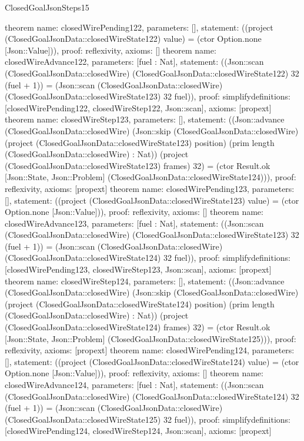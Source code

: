 \begin{lexlean}{ClosedGoalJsonSteps15}
\begin{semanticmodule}
{}
theorem{
 name: closedWirePending122, parameters: [],
 statement: ((project (ClosedGoalJsonData::closedWireState122) value) = (ctor Option.none [Json::Value])), proof: reflexivity{}, axioms: []
}
theorem{
 name: closedWireAdvance122, parameters: [fuel : Nat],
 statement: ((Json::scan (ClosedGoalJsonData::closedWire) (ClosedGoalJsonData::closedWireState122) 32 (fuel + 1)) = (Json::scan (ClosedGoalJsonData::closedWire) (ClosedGoalJsonData::closedWireState123) 32 fuel)), proof: simplify{definitions: [closedWirePending122, closedWireStep122, Json::scan]}, axioms: [propext]
}
theorem{
 name: closedWireStep123, parameters: [],
 statement: ((Json::advance (ClosedGoalJsonData::closedWire) (Json::skip (ClosedGoalJsonData::closedWire) (project (ClosedGoalJsonData::closedWireState123) position) (prim length (ClosedGoalJsonData::closedWire) : Nat)) (project (ClosedGoalJsonData::closedWireState123) frames) 32) = (ctor Result.ok [Json::State, Json::Problem] (ClosedGoalJsonData::closedWireState124))), proof: reflexivity{}, axioms: [propext]
}
theorem{
 name: closedWirePending123, parameters: [],
 statement: ((project (ClosedGoalJsonData::closedWireState123) value) = (ctor Option.none [Json::Value])), proof: reflexivity{}, axioms: []
}
theorem{
 name: closedWireAdvance123, parameters: [fuel : Nat],
 statement: ((Json::scan (ClosedGoalJsonData::closedWire) (ClosedGoalJsonData::closedWireState123) 32 (fuel + 1)) = (Json::scan (ClosedGoalJsonData::closedWire) (ClosedGoalJsonData::closedWireState124) 32 fuel)), proof: simplify{definitions: [closedWirePending123, closedWireStep123, Json::scan]}, axioms: [propext]
}
theorem{
 name: closedWireStep124, parameters: [],
 statement: ((Json::advance (ClosedGoalJsonData::closedWire) (Json::skip (ClosedGoalJsonData::closedWire) (project (ClosedGoalJsonData::closedWireState124) position) (prim length (ClosedGoalJsonData::closedWire) : Nat)) (project (ClosedGoalJsonData::closedWireState124) frames) 32) = (ctor Result.ok [Json::State, Json::Problem] (ClosedGoalJsonData::closedWireState125))), proof: reflexivity{}, axioms: [propext]
}
theorem{
 name: closedWirePending124, parameters: [],
 statement: ((project (ClosedGoalJsonData::closedWireState124) value) = (ctor Option.none [Json::Value])), proof: reflexivity{}, axioms: []
}
theorem{
 name: closedWireAdvance124, parameters: [fuel : Nat],
 statement: ((Json::scan (ClosedGoalJsonData::closedWire) (ClosedGoalJsonData::closedWireState124) 32 (fuel + 1)) = (Json::scan (ClosedGoalJsonData::closedWire) (ClosedGoalJsonData::closedWireState125) 32 fuel)), proof: simplify{definitions: [closedWirePending124, closedWireStep124, Json::scan]}, axioms: [propext]
}
\end{semanticmodule}
\end{lexlean}
